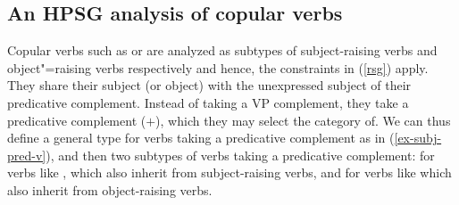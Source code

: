 \subsection{An HPSG analysis of copular verbs}
\label{control-sec-copula-verbs}
	
Copular verbs such as  or  are analyzed as subtypes of subject-raising verbs
and object"=raising verbs respectively and hence, the constraints in (\ref{rsg}) apply. They share their subject (or object) with the
unexpressed subject of their predicative complement. Instead of taking a VP complement, they take a
predicative complement (\prd $+$), which they may select the category of.  We can thus define a general type for verbs taking a predicative complement as in (\ref{ex-subj-pred-v}), 
and then two subtypes of verbs taking a predicative complement:   for verbs like , which also inherit from subject-raising verbs, and  for verbs like  which also inherit from object-raising verbs.

\eal
\label{ex-subj-pred-v}
 \impl  {}
\zl

